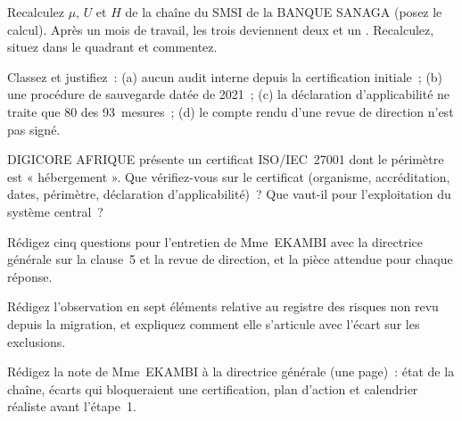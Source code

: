 \begin{boxexo}[title={\ding{45}\quad Exercice~20.5. Recalculer la lecture \niveaumoyen}]
Recalculez $\mu$, $U$ et $H$ de la chaîne du SMSI de la BANQUE SANAGA (posez
le calcul). Après un mois de travail, les trois \NEK{} deviennent deux
\OUI{} et un \NON{}. Recalculez, situez dans le quadrant et commentez.
\end{boxexo}

\begin{boxexo}[title={\ding{45}\quad Exercice~20.6. Majeure ou mineure~? \niveaumoyen}]
Classez et justifiez~: (a) aucun audit interne depuis la certification
initiale~; (b) une procédure de sauvegarde datée de 2021~; (c) la
déclaration d'applicabilité ne traite que 80 des 93~mesures~; (d) le
compte rendu d'une revue de direction n'est pas signé.
\end{boxexo}

\begin{boxexo}[title={\ding{45}\quad Exercice~20.7. Le certificat d'un prestataire \niveaumoyen}]
DIGICORE AFRIQUE présente un certificat ISO/IEC~27001 dont le périmètre
est « hébergement ». Que vérifiez-vous sur le certificat (organisme,
accréditation, dates, périmètre, déclaration d'applicabilité)~? Que vaut-il
pour l'exploitation du système central~?
\end{boxexo}

\begin{boxexo}[title={\ding{45}\quad Exercice~20.8. Interroger la direction \niveaumoyen}]
Rédigez cinq questions pour l'entretien de Mme~EKAMBI avec la directrice
générale sur la clause~5 et la revue de direction, et la pièce attendue
pour chaque réponse.
\end{boxexo}

\begin{boxexo}[title={\ding{45}\quad Exercice~20.9. Le SMSI après la migration \niveauexpert}]
Rédigez l'observation en sept éléments relative au registre des risques
non revu depuis la migration, et expliquez comment elle s'articule avec
l'écart sur les exclusions.
\end{boxexo}

\begin{boxexo}[title={\ding{45}\quad Exercice~20.10. Prêts pour la certification~? \niveauexpert}]
Rédigez la note de Mme~EKAMBI à la directrice générale (une page)~: état
de la chaîne, écarts qui bloqueraient une certification, plan d'action et
calendrier réaliste avant l'étape~1.
\end{boxexo}

